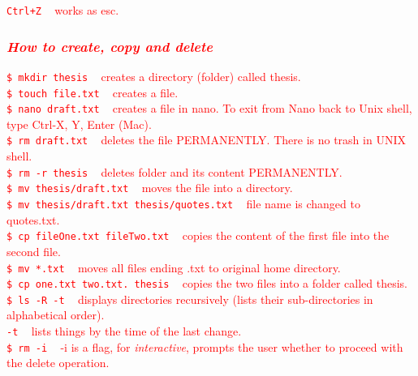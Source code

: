 \documentclass{article}
\begin{document}
\textcolor{red}{\texttt{Ctrl+Z} ~ works as esc.\\
\subsubsection{\small\textsl{How to create, copy and delete}}
\textcolor{red}{\texttt{\$ mkdir thesis}} ~ creates a directory (folder) called thesis.\\
\textcolor{red}{\texttt{\$ touch file.txt}} ~	creates a file.\\
\textcolor{red}{\texttt{\$ nano draft.txt}} ~	creates a file in nano. To exit from Nano back to Unix shell, type Ctrl-X, Y, Enter (Mac).\\
\textcolor{red}{\texttt{\$ rm draft.txt}} ~ deletes the file PERMANENTLY. There is no trash in UNIX shell.\\
\textcolor{red}{\texttt{\$ rm -r thesis}} ~ deletes folder and its content PERMANENTLY.\\
\textcolor{red}{\texttt{\$ mv thesis/draft.txt}} ~	moves the file into a directory.\\
\textcolor{red}{\texttt{\$ mv thesis/draft.txt thesis/quotes.txt}} ~  file name is changed to quotes.txt. \\
\textcolor{red}{\texttt{\$ cp fileOne.txt fileTwo.txt}} ~	copies the content of the first file into the second file.\\
\textcolor{red}{\texttt{\$ mv *.txt}} ~	moves all files ending .txt to original home directory.\\
\textcolor{red}{\texttt{\$ cp one.txt two.txt. thesis}} ~ copies the two files into a folder called thesis.\\
\textcolor{red}{\texttt{\$ ls -R -t}} ~ displays directories recursively (lists their sub-directories in  alphabetical order).\\
\textcolor{red}{\texttt{-t}} ~ lists things by the time of the last change.\\
\textcolor{red}{\texttt{\$ rm -i}} ~  -i is a flag, for \textit{interactive}, prompts the user whether to proceed with the delete operation.\\
}
\end{document}
